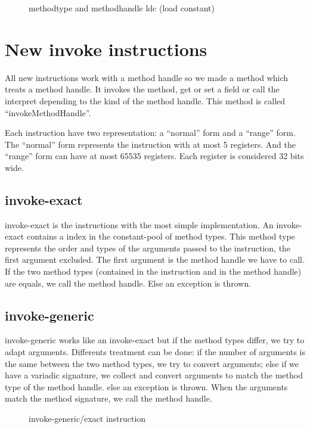 \documentclass{sig-alternate}
\begin{document}
  \begin{figure}[!h]
    \centering 
    \caption{methodtype and methodhandle ldc (load constant)}
    \label{MTMHldc}
  \end{figure}

\section{New invoke instructions}
  All new instructions work with a method handle so we made a method which treats a method handle.
  It invokes the method, get or set a field or call the interpret depending to the kind of the method handle.
  This method is called ``invokeMethodHandle''.
  
  Each instruction have two representation: a ``normal'' form and a ``range'' form.
  The ``normal'' form represents the instruction with at most 5 registers.
  And the ``range'' form can have at most 65535 registers.
  Each register is considered 32 bits wide.

  \subsection{invoke-exact}

    invoke-exact is the instructions with the most simple implementation.
    An invoke-exact contains a index in the constant-pool of method types.
    This method type represents the order and types of the arguments passed to the instruction, the first argument excluded.
    The first argument is the method handle we have to call.
    If the two method types (contained in the instruction and in the method handle) are equals, we call the method handle.
    Else an exception is thrown.

  \subsection{invoke-generic}

    invoke-generic works like an invoke-exact but if the method types differ, we try to adapt arguments.
    Differents treatment can be done:
    if the number of arguments is the same between the two method types, we try to convert arguments;
    else if we have a variadic signature, we collect and convert arguments to match the method type of the method handle.
    else an exception is thrown.
    When the arguments match the method signature, we call the method handle.

    \begin{figure}[!h]
      \centering 
      \caption{invoke-generic/exact instruction}
      \label{INGEins}
    \end{figure}
\end{document}
